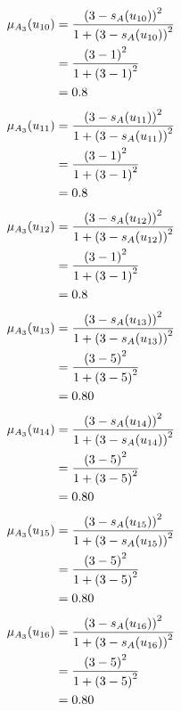 \documentclass[a4paper,openany]{book}
\begin{document}
				\begin{align}
					\mu_{A_3}(u_{10}) &= \frac{\left(3-s_A(u_{10})\right)^2}{1 + \left(3-s_A(u_{10})\right)^2}\\
					&= \frac{\left(3-1\right)^2}{1 + \left(3-1\right)^2} \notag \\
					&= 0.8 \notag
				\end{align}
				\begin{align}
					\mu_{A_3}(u_{11}) &= \frac{\left(3-s_A(u_{11})\right)^2}{1 + \left(3-s_A(u_{11})\right)^2}\\
					&= \frac{\left(3-1\right)^2}{1 + \left(3-1\right)^2} \notag \\
					&= 0.8 \notag
				\end{align}
				\begin{align}
					\mu_{A_3}(u_{12}) &= \frac{\left(3-s_A(u_{12})\right)^2}{1 + \left(3-s_A(u_{12})\right)^2}\\
					&= \frac{\left(3-1\right)^2}{1 + \left(3-1\right)^2} \notag \\
					&= 0.8 \notag
				\end{align}
				\begin{align}
					\mu_{A_3}(u_{13}) &= \frac{\left(3-s_A(u_{13})\right)^2}{1 + \left(3-s_A(u_{13})\right)^2}\\
					&= \frac{\left(3-5\right)^2}{1 + \left(3-5\right)^2} \notag \\
					&= 0.80 \notag
				\end{align}
				\begin{align}
					\mu_{A_3}(u_{14}) &= \frac{\left(3-s_A(u_{14})\right)^2}{1 + \left(3-s_A(u_{14})\right)^2}\\
					&= \frac{\left(3-5\right)^2}{1 + \left(3-5\right)^2} \notag \\
					&= 0.80 \notag
				\end{align}
				\begin{align}
					\mu_{A_3}(u_{15}) &= \frac{\left(3-s_A(u_{15})\right)^2}{1 + \left(3-s_A(u_{15})\right)^2}\\
					&= \frac{\left(3-5\right)^2}{1 + \left(3-5\right)^2} \notag \\
					&= 0.80 \notag
				\end{align}
				\begin{align}
					\mu_{A_3}(u_{16}) &= \frac{\left(3-s_A(u_{16})\right)^2}{1 + \left(3-s_A(u_{16})\right)^2}\\
					&= \frac{\left(3-5\right)^2}{1 + \left(3-5\right)^2} \notag \\
					&= 0.80 \notag
				\end{align}
\end{document}
